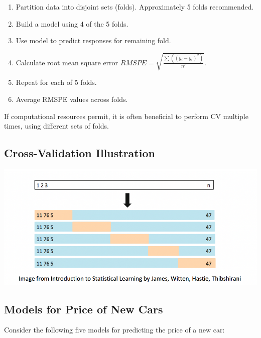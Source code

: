 \documentclass[]{book}
\providecommand{\tightlist}{%
  \setlength{\itemsep}{0pt}\setlength{\parskip}{0pt}}
\begin{document}
\begin{enumerate}
\def\labelenumi{\arabic{enumi}.}
\tightlist
\item
  Partition data into disjoint sets (folds). Approximately 5 folds
  recommended.\\
\item
  Build a model using 4 of the 5 folds.\\
\item
  Use model to predict responses for remaining fold.
\item
  Calculate root mean square error
  \(RMSPE=\displaystyle\sqrt{\frac{\sum((\hat{y}_i-y_i)^2)}{n'}}\).\\
\item
  Repeat for each of 5 folds.\\
\item
  Average RMSPE values across folds.
\end{enumerate}

If computational resources permit, it is often beneficial to perform CV
multiple times, using different sets of folds.

\subsection{Cross-Validation
Illustration}\label{cross-validation-illustration}

\includegraphics[width=0.75\linewidth]{CV}

\subsection{Models for Price of New
Cars}\label{models-for-price-of-new-cars}

Consider the following five models for predicting the price of a new
car:
\end{document}
